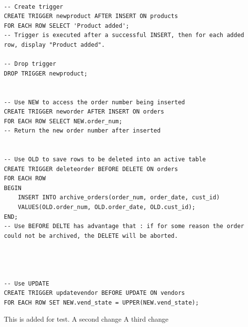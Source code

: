 \documentclass[12pt,oneside,a4paper]{article}
\begin{document}
\begin{lstlisting}

-- Create trigger 
CREATE TRIGGER newproduct AFTER INSERT ON products 
FOR EACH ROW SELECT 'Product added';
-- Trigger is executed after a successful INSERT, then for each added row, display "Product added". 

-- Drop trigger
DROP TRIGGER newproduct;


-- Use NEW to access the order number being inserted 
CREATE TRIGGER neworder AFTER INSERT ON orders 
FOR EACH ROW SELECT NEW.order_num;
-- Return the new order number after inserted 


-- Use OLD to save rows to be deleted into an active table 
CREATE TRIGGER deleteorder BEFORE DELETE ON orders 
FOR EACH ROW 
BEGIN 
    INSERT INTO archive_orders(order_num, order_date, cust_id)
    VALUES(OLD.order_num, OLD.order_date, OLD.cust_id);
END;
-- Use BEFORE DELTE has advantage that : if for some reason the order could not be archived, the DELETE will be aborted.




-- Use UPDATE 
CREATE TRIGGER updatevendor BEFORE UPDATE ON vendors
FOR EACH ROW SET NEW.vend_state = UPPER(NEW.vend_state);
\end{lstlisting}

This is added for test.
A second change
A third change
\end{document}
